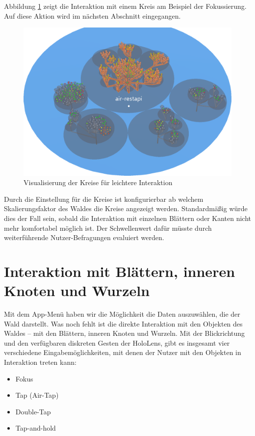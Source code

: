 Abbildung \ref{fig:circle-hover} zeigt die Interaktion mit einem Kreis am Beispiel der Fokussierung. Auf diese Aktion wird im nächsten Abschnitt eingegangen.
 
\begin{figure}[htb]
  \includegraphics[width=.8\textwidth]{figures/circle-hover}
  \caption{Visualisierung der Kreise für leichtere Interaktion}
  \label{fig:circle-hover}
\end{figure}

Durch die Einstellung für die Kreise ist konfigurierbar ab welchem Skalierungsfaktor des Waldes die Kreise angezeigt werden. Standardmäßig würde dies der Fall sein, sobald die Interaktion mit einzelnen Blättern oder Kanten nicht mehr komfortabel möglich ist. Der Schwellenwert dafür müsste durch weiterführende Nutzer-Befragungen evaluiert werden.

\section{Interaktion mit Blättern, inneren Knoten und Wurzeln}
\label{sec:object-interaction}

Mit dem App-Menü haben wir die Möglichkeit die Daten auszuwählen, die der Wald darstellt. Was noch fehlt ist die direkte Interaktion mit den Objekten des Waldes -- mit den Blättern, inneren Knoten und Wurzeln. Mit der Blickrichtung und den verfügbaren diskreten Gesten der HoloLens, gibt es insgesamt vier verschiedene Eingabemöglichkeiten, mit denen der Nutzer mit den Objekten in Interaktion treten kann:

\begin{itemize}
  \item Fokus
  \item Tap (Air-Tap)
  \item Double-Tap
  \item Tap-and-hold
\end{itemize}

